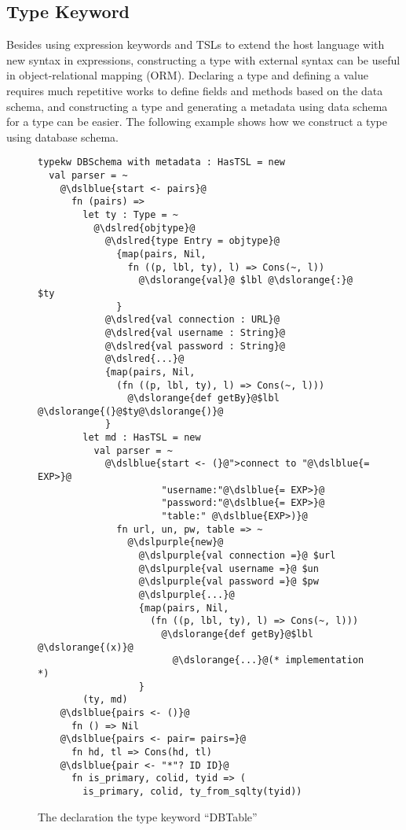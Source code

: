 \documentclass{sig-alternate}
\newcommand{\dslblue}[1]{\textcolor[HTML]{336699}{#1}}
\newcommand{\dslred}[1]{\textcolor[HTML]{FF0033}{#1}}
\newcommand{\dslorange}[1]{\textcolor[HTML]{FF6600}{#1}}
\newcommand{\dslpurple}[1]{\textcolor[HTML]{660066}{#1}}
\begin{document}
\subsection{Type Keyword}
Besides using expression keywords and TSLs to extend the host language with new syntax in expressions, constructing a type with external syntax can be useful in object-relational mapping (ORM). Declaring a type and defining a value requires much repetitive works to define fields and methods based on the data schema, and constructing a type and generating a metadata using data schema for a type can be easier. The following example shows how we construct a type using database schema.
\begin{figure}[ht]
\begin{lstlisting}[style=wyvern]
typekw DBSchema with metadata : HasTSL = new
  val parser = ~
    @\dslblue{start <- pairs}@
      fn (pairs) =>
        let ty : Type = ~
          @\dslred{objtype}@
            @\dslred{type Entry = objtype}@
              {map(pairs, Nil, 
                fn ((p, lbl, ty), l) => Cons(~, l))
                  @\dslorange{val}@ $lbl @\dslorange{:}@ $ty
              }
            @\dslred{val connection : URL}@
            @\dslred{val username : String}@
            @\dslred{val password : String}@
            @\dslred{...}@
            {map(pairs, Nil, 
              (fn ((p, lbl, ty), l) => Cons(~, l)))
                @\dslorange{def getBy}@$lbl @\dslorange{(}@$ty@\dslorange{)}@
            }
        let md : HasTSL = new 
          val parser = ~
            @\dslblue{start <- (}@">connect to "@\dslblue{= EXP>}@
                      "username:"@\dslblue{= EXP>}@
                      "password:"@\dslblue{= EXP>}@
                      "table:" @\dslblue{EXP>)}@
              fn url, un, pw, table => ~
                @\dslpurple{new}@ 
                  @\dslpurple{val connection =}@ $url
                  @\dslpurple{val username =}@ $un
                  @\dslpurple{val password =}@ $pw
                  @\dslpurple{...}@
                  {map(pairs, Nil, 
                    (fn ((p, lbl, ty), l) => Cons(~, l)))
                      @\dslorange{def getBy}@$lbl @\dslorange{(x)}@ 
                        @\dslorange{...}@(* implementation *)
                  }
        (ty, md)
    @\dslblue{pairs <- ()}@
      fn () => Nil 
    @\dslblue{pairs <- pair= pairs=}@
      fn hd, tl => Cons(hd, tl)
    @\dslblue{pair <- "*"? ID ID}@
      fn is_primary, colid, tyid => (
        is_primary, colid, ty_from_sqlty(tyid))
\end{lstlisting}
\vspace{-8px}
\caption{The declaration the type keyword ``DBTable''}
\vspace{-10px}
\label{typekw-example-1}
\end{figure}
\end{document}
